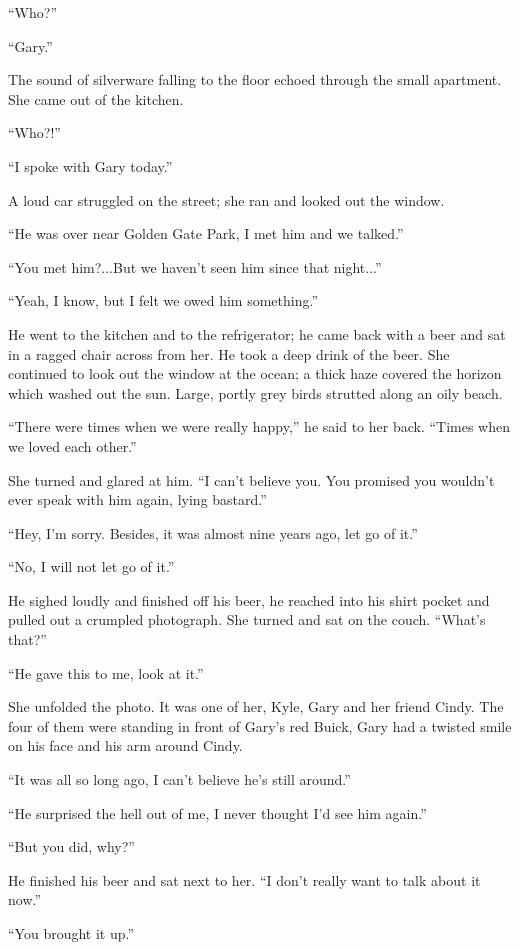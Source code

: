 ``Who?''

``Gary.''

The sound of silverware falling to the floor echoed through the small
apartment. She came out of the kitchen.

``Who?!''

``I spoke with Gary today.''

A loud car struggled on the street; she ran and looked out the window.

``He was over near Golden Gate Park, I met him and we talked.''

``You met him?...But we haven't seen him since that night...''

``Yeah, I know, but I felt we owed him something.''

He went to the kitchen and to the refrigerator; he came back with a beer
and sat in a ragged chair across from her. He took a deep drink of the
beer. She continued to look out the window at the ocean; a thick haze
covered the horizon which washed out the sun. Large, portly grey birds
strutted along an oily beach.

``There were times when we were really happy,'' he said to her back.
``Times when we loved each other.''

She turned and glared at him. ``I can't believe you. You promised you
wouldn't ever speak with him again, lying bastard.''

``Hey, I'm sorry. Besides, it was almost nine years ago, let go of it.''

``No, I will not let go of it.''

He sighed loudly and finished off his beer, he reached into his shirt
pocket and pulled out a crumpled photograph. She turned and sat on the
couch. ``What's that?''

``He gave this to me, look at it.''

She unfolded the photo. It was one of her, Kyle, Gary and her friend
Cindy. The four of them were standing in front of Gary's red Buick, Gary
had a twisted smile on his face and his arm around Cindy.

``It was all so long ago, I can't believe he's still around.''

``He surprised the hell out of me, I never thought I'd see him again.''

``But you did, why?''

He finished his beer and sat next to her. ``I don't really want to talk
about it now.''

``You brought it up.''

